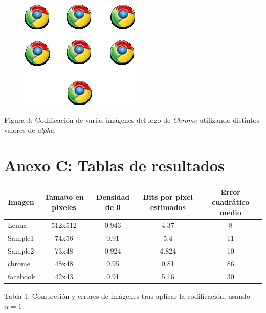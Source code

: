\documentclass[%
final,
%
reprint,
%
notitlepage,
narroweqnarray,
inline,
twoside,
invited
]{ieee}
\begin{document}
\begin{thebibliography}{1}
\begin{figure}[H]
	\includegraphics[scale=2.3]{./img/chromes.png}
\end{figure}
\begin{center}
\par Figura 3: Codificación de varias imágenes del logo de \textit{Chrome} utilizando distintos valores de \textit{alpha}.
\end{center}


\end{thebibliography}


\section*{Anexo C: Tablas de resultados}

\begin{center}
	\begin{tabular}{|l || c | c | c | c|}
		\hline
		\textbf{Imagen} & \textbf{Tamaño en pixeles} & \textbf{Densidad de 0} & \textbf{Bits por pixel estimados} & \textbf{Error cuadrático medio}\\
		\hline
		\hline
		Lenna & 512x512 & 0.943 & 4.37 & 8\\
		Sample1 & 74x56 & 0.91 & 5.4 & 11\\
		Sample2 & 73x48 & 0.924 & 4.824 & 10\\
		chrome & 48x48 & 0.95 & 0.81 & 86\\
		facebook & 42x43 & 0.91 & 5.16 & 30\\
		\hline
	\end{tabular}
\end{center}
\begin{center}
Tabla 1: Compresión y errores de imágenes tras aplicar la codificación, usando $\alpha=1$.
\end{center}
\end{document}
